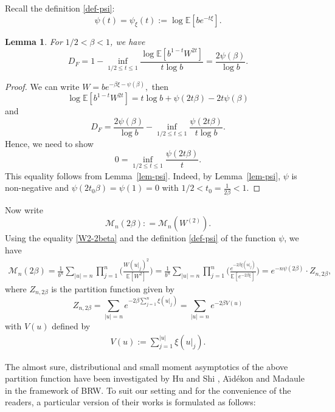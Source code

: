 \documentclass[12pt]{amsart}
\newtheorem{lemma}[theorem]{Lemma}
\theoremstyle{definition}
\theoremstyle{remark}
\newcommand{\E}{\mathbb{E}}
\newcommand{\MAB}{\mathscr{M}_{n}(W^{(2)})}
\numberwithin{equation}{section}
\begin{document}
Recall the definition \eqref{def-psi}: 
\[
\psi(t) = \psi_\xi(t):=\log \E[be^{-t\xi}]. 
\]

\begin{lemma}\label{lem-psi-beta}
For $1/2<\beta<1$, we have 
\[
 D_F=1 -   \inf_{1/2\le t\le 1} \frac{\log  \E[b^{1-t}W^{2t}]}{ t \log b} = \frac{ 2\psi(\beta)}{\log b}. 
\]
\end{lemma}

\begin{proof}
 We can  write 
$
W = b e^{-\beta \xi  - \psi(\beta)},
$
then 
\[
\log  \E[b^{1-t}W^{2t}]=t\log b+\psi(2t\beta)-2t\psi(\beta)
\]
and
\[
D_F=\frac{2\psi(\beta)}{\log b}-\inf_{1/2\leq t\leq 1}\frac{\psi(2t\beta)}{t\log b} .
\]
Hence, we need to show
\[
  0 =  \inf_{1/2\le t\le 1}  \frac{\psi(2t\beta)}{ t}. 
\]
This equality follows from Lemma~\ref{lem-psi}. Indeed,
by Lemma~\ref{lem-psi},  $\psi$ is non-negative and   $\psi(2 t_0 \beta) = \psi(1)=0$ with
$
1/2 < t_0 = \frac{1}{2\beta} <1$. 
\end{proof}




Now write 
\[
\mathscr{M}_n(2\beta): = \MAB.
\]
Using the equality \eqref{W2-2beta} and the definition \eqref{def-psi} of the function $\psi$, we have
\begin{align}\label{Mn-beta-Z}
\mathscr{M}_n(2\beta) = \frac{1}{b^n} \sum_{|u|=n}  \prod_{j=1}^n \Big(    \frac{W(u|_j)^2}{\E[W^2]}  \Big) =  \frac{1}{b^n} \sum_{|u|=n}  \prod_{j=1}^n \Big(    \frac{e^{-2\beta \xi(u|_j)} }{\E[e^{-2\beta\xi}]}  \Big) =    e^{-n \psi(2\beta)} \cdot Z_{n, 2\beta},
\end{align}
where $Z_{n, 2\beta}$ is the partition function given by
\[
Z_{n,2\beta} = \sum_{|u|=n} e^{- 2\beta  \sum_{j=1}^n \xi(u|_j)} = \sum_{|u|=n} e^{- 2 \beta V(u)}
\]
with $V(u)$ defined by
 \begin{align}\label{eqn-BRW-VU}
 V(u) := \sum_{j=1}^{|u|}  \xi(u|_j). 
 \end{align}


The almost sure, distributional and small moment asymptotics  of the above partition function have been investigated by Hu and Shi \cite{Shi},   A\"{\i}d\'{e}kon \cite{Elie-AOP} and Madaule \cite{Mad} in the framework of BRW.     To suit our setting and for the convenience of the readers, a particular version of their works is formulated as follows:
\end{document}
